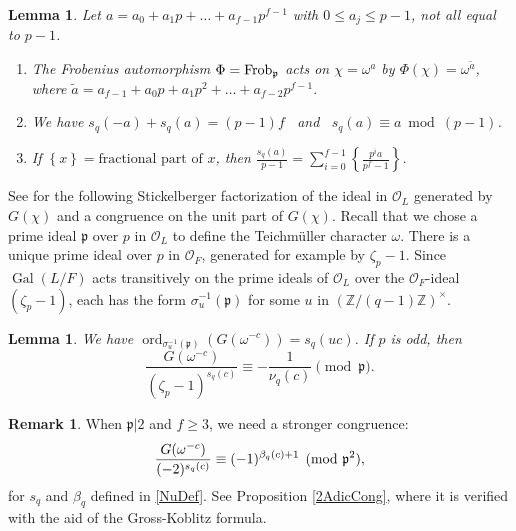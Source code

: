 \documentclass[12pt]{amsart}  \usepackage{amsmath,amssymb,enumerate,amscd,tikz,url}
\numberwithin{equation}{section}
\newtheorem{lemma}[equation]{Lemma}
\theoremstyle{definition}
\newtheorem{Rem}[equation]{Remark}
\newcommand{\Z}{{\mathbb Z}}
\newcommand{\gp}{{\mathfrak p}}
\newcommand{\cO}{{\mathcal O}}
\newcommand{\Gal}{\operatorname{Gal}}
\newcommand{\ord}{\operatorname{ord}}
\newcommand{\Frob}{{\rm Frob}}
\newcommand{\fpart}[1]{{\left\{ {#1}  \right\}}}
\begin{document}
\begin{lemma}  \label{cs}
Let $a = a_0 + a_1p + \dots + a_{f-1}p^{f-1}$ with $0 \le a_j \le p-1$, not all equal to $p-1$.
\begin{enumerate}[\hspace{2 pt}\rm i)]
\item The Frobenius automorphism $\Phi = \Frob_\gp$ acts on $\chi = \omega^a$ by $\Phi(\chi) = \omega^{\tilde{a}}$, where 
$
\tilde{a} = a_{f-1}+a_0p + a_1p^2 + \dots + a_{f-2}p^{f-1}.
$

\vspace{4 pt}

\item We have $s_q(-a) + s_q(a) = (p-1)f$ \, and \, $s_q(a) \equiv a \bmod{(p-1)}$.  \vspace{4 pt}
\item If $\fpart{x} = \text{fractional part of } x$, then $\displaystyle{\frac{s_q(a)}{p-1} =  \sum_{i=0}^{f-1} \left\{\frac{p^i a}{p^f-1}\right\}}$.
\end{enumerate}
\end{lemma}

See \cite[IV, \S3, Thm.]{L} for the following Stickelberger factorization of the ideal in $\cO_L$ generated by $G(\chi)$ and a congruence on the unit part of $G(\chi)$.  Recall that we chose a prime ideal $\gp$ over $p$ in $\cO_L$ to define the Teichm\"{u}ller character $\omega$.  There is a unique prime ideal over $p$ in $\cO_F$, generated for example by $\zeta_p - 1$.  Since $\Gal(L/F)$ acts transitively on the prime ideals of $\cO_L$ over the $\cO_F$-ideal $(\zeta_p-1)$, each has the form $\sigma^{-1}_u(\gp)$ for some $u$ in $(\Z/(q-1)\Z)^\times$.  

\begin{lemma}  \label{Stick}
We have $\ord_{\sigma^{-1}_u(\gp)} (G(\omega^{-c})) = s_q(uc)$.  If $p$ is odd, then
$$
\frac{G(\omega^{-c})}{(\zeta_p-1)^{s_q(c)}} \equiv - \frac{1}{\nu_q(c)} \pmod{\gp}.  
$$
\end{lemma}

\vspace{3 pt}

\begin{Rem}  \label{Nu2}
When $\gp \vert 2$ and $f \ge 3$, we need a stronger congruence:
$$
\frac{G(\omega^{-c})}{(-2)^{s_q(c)}} \equiv (-1)^{\beta_q(c)+1} \pmod{\gp^2},  \vspace{2 pt}
$$
for $s_q$ and $\beta_q$ defined in \eqref{NuDef}.  See Proposition \ref{2AdicCong}, where it is verified with the aid of the Gross-Koblitz formula.  
\end{Rem}
\end{document}
